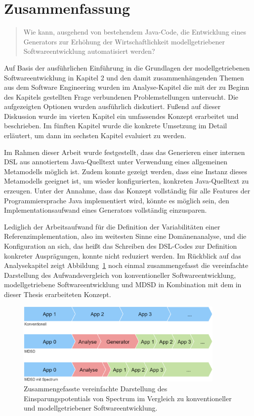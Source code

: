 \documentclass[12pt,oneside,a4paper,parskip]{scrbook}
\begin{document}
\section{Zusammenfassung}

\begin{quote}\glqq Wie kann, ausgehend von bestehendem Java-Code, die Entwicklung eines Generators zur Erhöhung der Wirtschaftlichkeit modellgetriebener Softwareentwicklung automatisiert werden?\grqq \end{quote}

Auf Basis der ausführlichen Einführung in die Grundlagen der modellgetriebenen Softwareentwicklung in Kapitel 2 und den damit zusammenhängenden Themen aus dem Software Engineering wurden im Analyse-Kapitel die mit der zu Beginn des Kapitels gestellten Frage verbundenen Problemstellungen untersucht. Die aufgezeigten Optionen wurden ausführlich diskutiert. Fußend auf dieser Diskussion wurde im vierten Kapitel ein umfassendes Konzept erarbeitet und beschrieben. Im fünften Kapitel wurde die konkrete Umsetzung im Detail erläutert, um dann im sechsten Kapitel evaluiert zu werden.

Im Rahmen dieser Arbeit wurde festgestellt, dass das Generieren einer internen DSL aus annotiertem Java-Quelltext unter Verwendung eines allgemeinen Metamodells möglich ist. Zudem konnte gezeigt werden, dass eine Instanz dieses Metamodells geeignet ist, um wieder konfigurierten, konkreten Java-Quelltext zu erzeugen. Unter der Annahme, dass das Konzept vollständig für alle Features der Programmiersprache Java implementiert wird, könnte es möglich sein, den Implementationsaufwand eines Generators vollständig einzusparen.

Lediglich der Arbeitsaufwand für die Definition der Variabilitäten einer Referenzimplementation, also im weitesten Sinne eine Domänenanalyse, und die Konfiguration an sich, das heißt das Schreiben des DSL-Codes zur Definition konkreter Ausprägungen, konnte nicht reduziert werden. Im Rückblick auf das Analysekapitel zeigt Abbildung~\ref{fig:vgl3} noch einmal zusammengefasst die vereinfachte Darstellung des Aufwandsvergleich von konventioneller Softwareentwicklung, modellgetriebene Softwareentwicklung und MDSD in Kombination mit dem in dieser Thesis erarbeiteten Konzept.

\begin{figure}[htbp]
\centering
\includegraphics[width=0.9\textwidth]{bilder/vergleich_3}
\caption{Zusammengefasste vereinfachte Darstellung des Einsparungspotentials von Spectrum im Vergleich zu konventioneller und modellgetriebener Softwareentwicklung.}
\label{fig:vgl3}
\end{figure}
\end{document}
